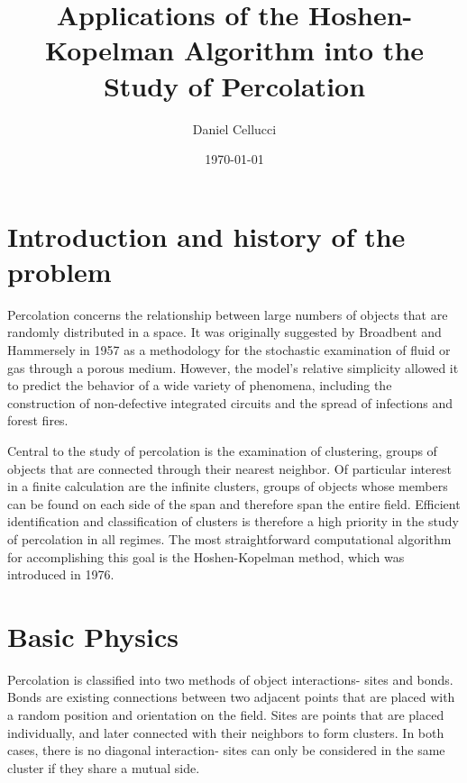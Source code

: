 \documentclass[twocolumn,prb,amsmath,amssymb,amsfonts]{revtex4}
\begin{document}
\title{Applications of the Hoshen-Kopelman Algorithm into the Study of Percolation }

\author{Daniel Cellucci}

\date{\today}

\begin{abstract}

\end{abstract}

\maketitle
\section{Introduction and history of the problem}
Percolation concerns the relationship between large numbers of objects that are randomly distributed in a space. It was originally suggested by Broadbent and Hammersely in 1957 as a methodology for the stochastic examination of fluid or gas through a porous medium. However, the model's relative simplicity allowed it to predict the behavior of a wide variety of phenomena, including the construction of non-defective integrated circuits and the spread of infections and forest fires.  

Central to the study of percolation is the examination of clustering, groups of objects that are connected through their nearest neighbor. Of particular interest in a finite calculation are the infinite clusters, groups of objects whose members can be found on each side of the span and therefore span the entire field. Efficient identification and classification of clusters is therefore a high priority in the study of percolation in all regimes. The most straightforward computational algorithm for accomplishing this goal is the Hoshen-Kopelman method, which was introduced in 1976.

\section{Basic Physics}
Percolation is classified into two methods of object interactions- sites and bonds. Bonds are existing connections between two adjacent points that are placed with a random position and orientation on the field. Sites are points that are placed individually, and later connected with their neighbors to form clusters. In both cases, there is no diagonal interaction- sites can only be considered in the same cluster if they share a mutual side.
\end{document}
